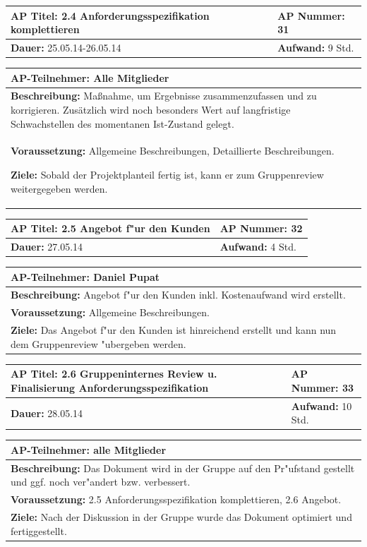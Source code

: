 \documentclass[fontsize=12pt,paper=a4,twoside]{scrartcl}
\begin{document}
\begin{tabular}{|p{7.43cm}|p{7.43cm}|}
\hline
\textbf{AP Titel: }2.4 Anforderungsspezifikation komplettieren & \textbf{AP Nummer: }31\\ 
\hline
\textbf{Dauer: }25.05.14-26.05.14 & \textbf{Aufwand: } 9 Std.\\
\hline
\end{tabular}
\begin{tabular}{|p{15.3cm}|}
\hline
\textbf{AP-Teilnehmer: }Alle Mitglieder\\
\hline
\textbf{Beschreibung: }Maßnahme, um Ergebnisse zusammenzufassen und zu korrigieren. Zusätzlich wird noch besonders Wert auf langfristige Schwachstellen des momentanen Ist-Zustand gelegt.\\
\hline
\textbf{Voraussetzung: }Allgemeine Beschreibungen, Detaillierte Beschreibungen.\

\textbf{Ziele: }Sobald der Projektplanteil fertig ist, kann er zum Gruppenreview weitergegeben werden.\\
\hline 
\end{tabular}

\begin{tabular}{|p{7.43cm}|p{7.43cm}|}
\hline
\textbf{AP Titel: }2.5 Angebot f"ur den Kunden & \textbf{AP Nummer: }32\\ 
\hline
\textbf{Dauer: }27.05.14 & \textbf{Aufwand: } 4 Std.\\
\hline
\end{tabular}
\begin{tabular}{|p{15.3cm}|}
\hline
\textbf{AP-Teilnehmer: }Daniel Pupat\\
\hline
\textbf{Beschreibung: }Angebot f"ur den Kunden inkl. Kostenaufwand wird erstellt.\\
\hline
\textbf{Voraussetzung: }Allgemeine Beschreibungen.\\
\hline 
\textbf{Ziele: }Das Angebot f"ur den Kunden ist hinreichend erstellt und kann nun dem Gruppenreview "ubergeben werden.\\
\hline 
\end{tabular}

\begin{tabular}{|p{7.43cm}|p{7.43cm}|}
\hline
\textbf{AP Titel: }2.6 Gruppeninternes Review u. Finalisierung Anforderungsspezifikation & \textbf{AP Nummer: }33\\ 
\hline
\textbf{Dauer: }28.05.14 & \textbf{Aufwand: } 10 Std.\\
\hline
\end{tabular}
\begin{tabular}{|p{15.3cm}|}
\hline
\textbf{AP-Teilnehmer: }alle Mitglieder\\
\hline
\textbf{Beschreibung: }Das Dokument wird in der Gruppe auf den Pr"ufstand gestellt und ggf. noch ver"andert bzw. verbessert.\\
\hline
\textbf{Voraussetzung: }2.5 Anforderungsspezifikation komplettieren, 2.6 Angebot.\\
\hline 
\textbf{Ziele: }Nach der Diskussion in der Gruppe wurde das Dokument optimiert und fertiggestellt.\\
\hline 
\end{tabular}
\end{document}
